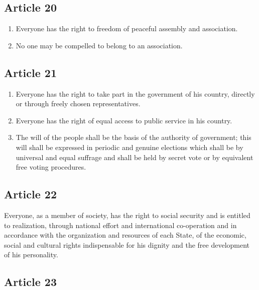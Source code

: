 \documentclass[
  ngerman,
  american,
  titlepage,
  openright,
  DIV=calc,
  toc=listof,
  listof=nochaptergap]{scrbook}
\begin{document}
\subsection{Article 20}\label{article-20-2}

\begin{enumerate}
\def\labelenumi{\arabic{enumi}.}
\item
  Everyone has the right to freedom of peaceful assembly and
  association.
\item
  No one may be compelled to belong to an association.
\end{enumerate}

\subsection{Article 21}\label{article-21-2}

\begin{enumerate}
\def\labelenumi{\arabic{enumi}.}
\item
  Everyone has the right to take part in the government of his country,
  directly or through freely chosen representatives.
\item
  Everyone has the right of equal access to public service in his
  country.
\item
  The will of the people shall be the basis of the authority of
  government; this will shall be expressed in periodic and genuine
  elections which shall be by universal and equal suffrage and shall be
  held by secret vote or by equivalent free voting procedures.
\end{enumerate}

\subsection{Article 22}\label{article-22-2}

Everyone, as a member of society, has the right to social security and
is entitled to realization, through national effort and international
co-operation and in accordance with the organization and resources of
each State, of the economic, social and cultural rights indispensable
for his dignity and the free development of his personality.

\subsection{Article 23}\label{article-23-2}
\end{document}
